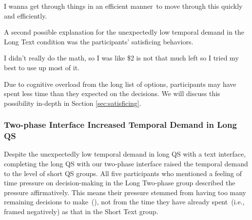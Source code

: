 \begin{displayquote}
I wanna get through things in an efficient manner~\bracketellipsis to move through this quickly and efficiently. \hfill{}
\end{displayquote}


A second possible explanation for the unexpectedly low temporal demand in the Long Text condition was the participants' satisficing behaviors. 

\begin{displayquote}
I didn't really do the math, so I was like \$2 is not that much left so I tried my best to use up most of it. \\\hfill{}
\end{displayquote}

Due to cognitive overload from the long list of options, participants may have spent less time than they expected on the decisions. We will discuss this possibility in-depth in Section \ref{sec:satisficing}.

\subsubsection{Two-phase Interface Increased Temporal Demand in Long QS} Despite the unexpectedly low temporal demand in long QS with a text interface, completing the long QS with our two-phase interface raised the temporal demand to the level of short QS groups. All five participants who mentioned a feeling of time pressure on decision-making in the Long Two-phase group described the pressure affirmatively. This means their pressure stemmed from having too many remaining decisions to make~(), not from the time they have already spent~(i.e., framed negatively) as that in the Short Text group. 

